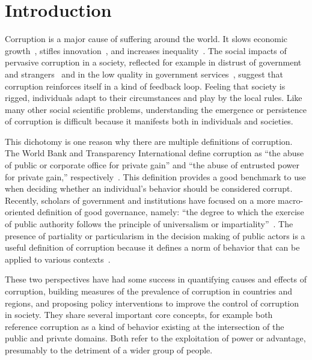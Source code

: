 \chapter{Introduction}

Corruption is a major cause of suffering around the world. It slows economic growth~\cite{mauro1995corruption}, stifles innovation~\cite{rodriguez2014quality}, and increases inequality~\cite{gupta2002does}. The social impacts of pervasive corruption in a society, reflected for example in distrust of government and strangers~\cite{rothstein2013corruption} and in the low quality in government services~\cite{lambsdorff2001corruption}, suggest that corruption reinforces itself in a kind of feedback loop. Feeling that society is rigged, individuals adapt to their circumstances and play by the local rules. Like many other social scientific problems, understanding the emergence or persistence of corruption is difficult because it manifests both in individuals and societies. 

This dichotomy is one reason why there are multiple definitions of corruption. The World Bank and Transparency International define corruption as ``the abuse of public or corporate office for private gain'' and ``the abuse of entrusted power for private gain,'' respectively~\cite{nye1967corruption,rose1978corruption,transparency2007global}. This definition provides a good benchmark to use when deciding whether an individual's behavior should be considered corrupt. Recently, scholars of government and institutions have focused on a more macro-oriented definition of good governance, namely: ``the degree to which the exercise of public authority follows the principle of universalism or impartiality''~\cite{rothstein2008quality}. The presence of partiality or particularism in the decision making of public actors is a useful definition of corruption because it defines a norm of behavior that can be applied to various contexts~\cite{mungiu2013controlling}.

These two perspectives have had some success in quantifying causes and effects of corruption, building measures of the prevalence of corruption in countries and regions, and proposing policy interventions to improve the control of corruption in society. They share several important core concepts, for example both reference corruption as a kind of behavior existing at the intersection of the public and private domains. Both refer to the exploitation of power or advantage, presumably to the detriment of a wider group of people.

